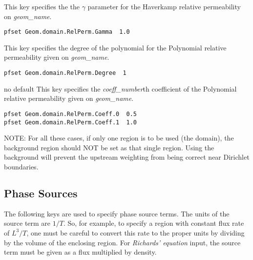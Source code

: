 {This key specifies the the $\gamma$ parameter for the Haverkamp relative
permeability on {\em geom\_name}.
}
\begin{display}\begin{verbatim}
pfset Geom.domain.RelPerm.Gamma  1.0
\end{verbatim}\end{display}

{This key specifies the degree of the polynomial for the Polynomial relative
permeability given on {\em geom\_name}.
}
\begin{display}\begin{verbatim}
pfset Geom.domain.RelPerm.Degree  1
\end{verbatim}\end{display}

{no default}
{This key specifies the {\em coeff\_number}th coefficient of the Polynomial
relative permeability given on {\em geom\_name}.
}
\begin{display}\begin{verbatim}
pfset Geom.domain.RelPerm.Coeff.0  0.5
pfset Geom.domain.RelPerm.Coeff.1  1.0
\end{verbatim}\end{display}

NOTE: For all these cases, if only one region is to be used (the domain),
the background region should NOT be set as that single region.
Using the background will prevent the
upstream weighting from being correct near Dirichlet boundaries.


\subsection{Phase Sources}
\label{Phase Sources}

The following keys are used to specify phase source terms.
The units of the source term are $1/T$.
So, for example, to specify a region with constant flux rate of $L^3/T$,
one must be careful to convert this rate to the proper units by
dividing by the volume of the enclosing region.
For {\em Richards' equation} input, the source term must be given as a flux
multiplied by density.

